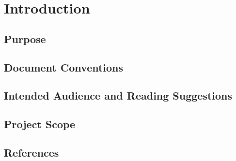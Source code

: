 \section{Introduction}


\subsection{Purpose}

\subsection{Document Conventions}

\subsection{Intended Audience and Reading Suggestions}

\subsection{Project Scope}

\subsection{References}


